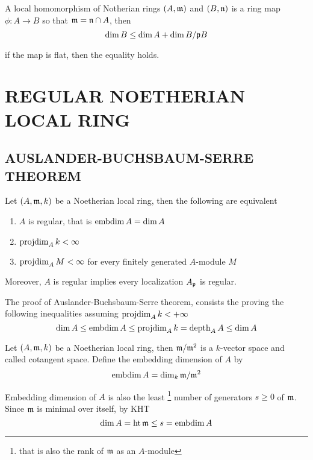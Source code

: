 \begin{remark}
	A local homomorphism of Notherian rings $(A, \mathfrak{m})$ and $(B, \mathfrak{n})$ is a ring map $\phi: A \to B$ so that $\mathfrak{m} = \mathfrak{n} \cap A$, then
	$$
	\dim B \leq \dim A + \dim B / \mathfrak{p} B
	$$
	
	if the map is flat, then the equality holds.
\end{remark}

\section{REGULAR  NOETHERIAN LOCAL RING}

\subsection{AUSLANDER-BUCHSBAUM-SERRE THEOREM}

\begin{theorem}
	Let $(A, \mathfrak{m}, k)$ be a Noetherian local ring, then the following are equivalent
	\begin{enumerate}
		\item $A$ is regular, that is $\operatorname{embdim} A = \dim A$
		\item $\operatorname{projdim}_A k < \infty$
		\item $\operatorname{projdim}_A M < \infty$ for every finitely generated $A$-module $M$
	\end{enumerate}
	
	Moreover, $A$ is regular implies every localization $A_{\mathfrak{p}}$ is regular.
\end{theorem}

The proof of Auslander-Buchsbaum-Serre theorem, consists the proving the following inequalities assuming $\operatorname{projdim}_A k < +\infty$
$$
	\dim A \leq \operatorname{embdim} A \leq \operatorname{projdim}_A k = \operatorname{depth}_A A \leq \dim A
$$

\begin{definition}
	Let $(A, \mathfrak{m}, k)$ be a Noetherian local ring, then $\mathfrak{m} / \mathfrak{m}^2$ is a $k$-vector space and called cotangent space. Define the embedding dimension of $A$ by
	$$
		\operatorname{embdim} A = \dim_k \mathfrak{m} / \mathfrak{m}^2
	$$
\end{definition}

\begin{remark}
	Embedding dimension of $A$ is also the least \footnote{that is also the rank of $\mathfrak{m}$ as an $A$-module} number of generators $s \geq 0$ of $\mathfrak{m}$. Since $\mathfrak{m}$ is minimal over itself, by KHT
	$$
		\dim A = \operatorname{ht} \mathfrak{m} \leq s = \operatorname{embdim} A
	$$
\end{remark}

